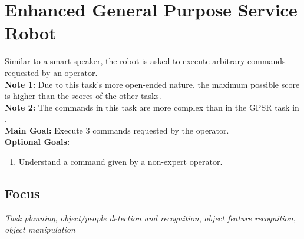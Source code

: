 \section{Enhanced General Purpose Service Robot}
\label{test:egpsr}
Similar to a smart speaker, the robot is asked to execute arbitrary commands requested by an operator.\\
\textbf{Note 1:} Due to this task's more open-ended nature, the maximum possible score is higher than the scores of the other \STWO{} tasks.\\
\textbf{Note 2:} The commands in this task are more complex than in the GPSR task in \SONE.\\

\noindent \textbf{Main Goal:} Execute 3 commands requested by the operator.\\

\noindent \textbf{Optional Goals:}
\begin{enumerate}[nosep]
	\item Understand a command given by a non-expert operator.
\end{enumerate}

\subsection*{Focus}
\emph{Task planning}, \emph{object/people detection and recognition}, \emph{object feature recognition}, \emph{object manipulation}


